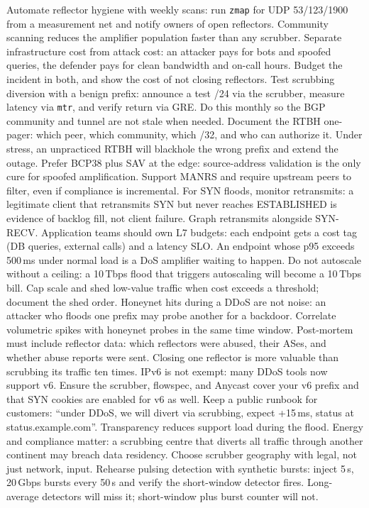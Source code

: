 Automate reflector hygiene with weekly scans: run \texttt{zmap} for UDP 53/123/1900 from a measurement net and notify owners of open reflectors. Community scanning reduces the amplifier population faster than any scrubber.
Separate infrastructure cost from attack cost: an attacker pays for bots and spoofed queries, the defender pays for clean bandwidth and on-call hours. Budget the incident in both, and show the cost of not closing reflectors.
Test scrubbing diversion with a benign prefix: announce a test /24 via the scrubber, measure latency via \texttt{mtr}, and verify return via GRE. Do this monthly so the BGP community and tunnel are not stale when needed.
Document the RTBH one-pager: which peer, which community, which /32, and who can authorize it. Under stress, an unpracticed RTBH will blackhole the wrong prefix and extend the outage.
Prefer BCP38 plus SAV at the edge: source-address validation is the only cure for spoofed amplification. Support MANRS and require upstream peers to filter, even if compliance is incremental.
For SYN floods, monitor retransmits: a legitimate client that retransmits SYN but never reaches ESTABLISHED is evidence of backlog fill, not client failure. Graph retransmits alongside SYN-RECV.
Application teams should own L7 budgets: each endpoint gets a cost tag (DB queries, external calls) and a latency SLO. An endpoint whose p95 exceeds 500\,ms under normal load is a DoS amplifier waiting to happen.
Do not autoscale without a ceiling: a 10\,Tbps flood that triggers autoscaling will become a 10\,Tbps bill. Cap scale and shed low-value traffic when cost exceeds a threshold; document the shed order.
Honeynet hits during a DDoS are not noise: an attacker who floods one prefix may probe another for a backdoor. Correlate volumetric spikes with honeynet probes in the same time window.
Post-mortem must include reflector data: which reflectors were abused, their ASes, and whether abuse reports were sent. Closing one reflector is more valuable than scrubbing its traffic ten times.
IPv6 is not exempt: many DDoS tools now support v6. Ensure the scrubber, flowspec, and Anycast cover your v6 prefix and that SYN cookies are enabled for v6 as well.
Keep a public runbook for customers: ``under DDoS, we will divert via scrubbing, expect +15\,ms, status at status.example.com''. Transparency reduces support load during the flood.
Energy and compliance matter: a scrubbing centre that diverts all traffic through another continent may breach data residency. Choose scrubber geography with legal, not just network, input.
Rehearse pulsing detection with synthetic bursts: inject 5\,s, 20\,Gbps bursts every 50\,s and verify the short-window detector fires. Long-average detectors will miss it; short-window plus burst counter will not.
